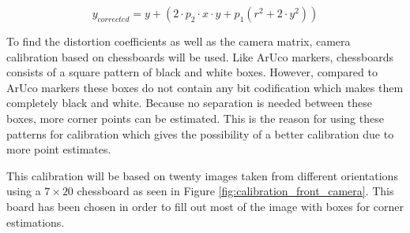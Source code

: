 \documentclass[../Head/report.tex]{subfiles}
\begin{document}
\begin{equation}
	y_{corrected} = y + (2 \cdot p_2 \cdot x \cdot y  + p_1(r^2 + 2 \cdot y^2))
	\label{eq:y_corrected_radial_distortion}
\end{equation}

To find the distortion coefficients as well as the camera matrix, camera calibration based on chessboards will be used. Like ArUco markers, chessboards consists of a square pattern of black and white boxes. However, compared to ArUco markers these boxes do not contain any bit codification which makes them completely black and white. Because no separation is needed between these boxes, more corner points can be estimated. This is the reason for using these patterns for calibration which gives the possibility of a better calibration due to more point estimates.   

This calibration will be based on twenty images taken from different orientations using a $7 \times20 $ chessboard as seen in Figure \ref{fig:calibration_front_camera}. This board has been chosen in order to fill out most of the image with boxes for corner estimations. 
\end{document}
